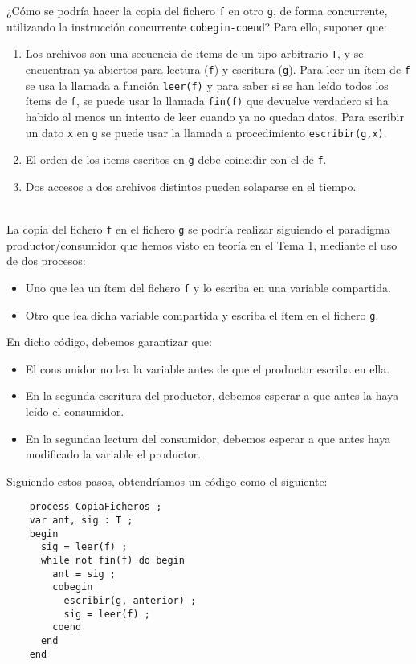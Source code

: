 \begin{ejercicio}
    ¿Cómo se podría hacer la copia del fichero \verb|f| en otro \verb|g|, de forma concurrente, utilizando la
    instrucción concurrente \verb|cobegin-coend|? Para ello, suponer que:
    \begin{enumerate}
        \item Los archivos son una secuencia de items de un tipo arbitrario \verb|T|, y se encuentran ya abiertos
        para lectura (\verb|f|) y escritura (\verb|g|). Para leer un ítem de \verb|f| se usa la llamada a función \verb|leer(f)| y
        para saber si se han leído todos los ítems de \verb|f|, se puede usar la llamada \verb|fin(f)| que devuelve
        verdadero si ha habido al menos un intento de leer cuando ya no quedan datos. Para
        escribir un dato \verb|x| en \verb|g| se puede usar la llamada a procedimiento \verb|escribir(g,x)|.

        \item El orden de los items escritos en \verb|g| debe coincidir con el de \verb|f|.
        \item Dos accesos a dos archivos distintos pueden solaparse en el tiempo.
    \end{enumerate}~\\

\noindent
La copia del fichero \verb|f| en el fichero \verb|g| se podría realizar siguiendo el paradigma productor/consumidor que hemos visto en teoría en el Tema 1, mediante el uso de dos procesos:
\begin{itemize}
    \item Uno que lea un ítem del fichero \verb|f| y lo escriba en una variable compartida.
    \item Otro que lea dicha variable compartida y escriba el ítem en el fichero \verb|g|.
\end{itemize}
En dicho código, debemos garantizar que:
\begin{itemize}
    \item El consumidor no lea la variable antes de que el productor escriba en ella.
    \item En la segunda escritura del productor, debemos esperar a que antes la haya leído el consumidor.
    \item En la segundaa lectura del consumidor, debemos esperar a que antes haya modificado la variable el productor.
\end{itemize}
Siguiendo estos pasos, obtendríamos un código como el siguiente:
\begin{verbatim}
    process CopiaFicheros ;
    var ant, sig : T ;
    begin
      sig = leer(f) ;
      while not fin(f) do begin
        ant = sig ;
        cobegin
          escribir(g, anterior) ;
          sig = leer(f) ;
        coend
      end
    end
\end{verbatim}


\end{ejercicio}

